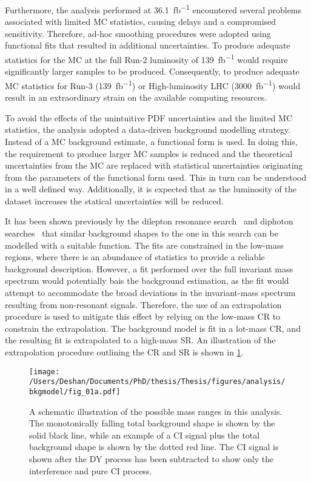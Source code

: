Furthermore, the analysis performed at \SI{36.1}{\femto\barn^{-1}} encountered several problems associated with limited MC statistics, causing delays and a compromised sensitivity. Therefore, ad-hoc smoothing procedures were adopted using functional fits that resulted in additional uncertainties. To produce adequate statistics for the MC at the full Run-2 luminosity of \SI{139}{\femto\barn^{-1}} would require significantly larger samples to be produced. Consequently, to produce adequate MC statistics for Run-3 (\SI{139}{\femto\barn^{-1}}) or High-luminosity LHC (\SI{3000}{\femto\barn^{-1}}) would result in an extraordinary strain on the available computing resources. 

To avoid the effects of the unintuitive PDF uncertainties and the limited MC statistics, the analysis adopted a data-driven background modelling strategy. Instead of a MC background estimate, a functional form is used. In doing this, the requirement to produce larger MC samples is reduced and the theoretical uncertainties from the MC are replaced with statistical uncertainties originating from the parameters of the functional form used. This in turn can be understood in a well defined way. Additionally, it is expected that as the luminosity of the dataset increases the statical uncertainties will be reduced. 

It has been shown previously by the dilepton resonance search~\cite{Aad:2019fac} and diphoton searches~\cite{Aaboud:2016tru,Aaboud:2017yyg} that similar background shapes to the one in this search can be modelled with a suitable function. The fits are constrained in the low-mass regions, where there is an abundance of statistics to provide a reliable background description. However, a fit performed over the full invariant mass spectrum would potentially bais the background estimation, as the fit would attempt to accommodate the broad deviations in the invariant-mass spectrum resulting from non-resonant signals. Therefore, the use of an extrapolation procedure is used to mitigate this effect by relying on the low-mass CR to constrain the extrapolation. The background model is fit in a lot-mass CR, and the resulting fit is extrapolated to a high-mass SR. An illustration of the extrapolation procedure outlining the CR and SR is shown in \cref{fig:bkgmodel:ranges}.

\begin{figure}[!htpb]
    \centering
    \texttt{[image: /Users/Deshan/Documents/PhD/thesis/Thesis/figures/analysis/bkgmodel/fig\_01a.pdf]} 
    \caption[A schematic illustration of the possible mass ranges in this analysis.]{A schematic illustration of the possible mass ranges in this analysis.
    The monotonically falling total background shape is shown by the solid black line, while an example of a CI signal plus the total background shape is shown by the dotted red line. The CI signal is shown after the DY process has been subtracted to show only the interference and pure CI process.}
    \label{fig:bkgmodel:ranges}
\end{figure}

